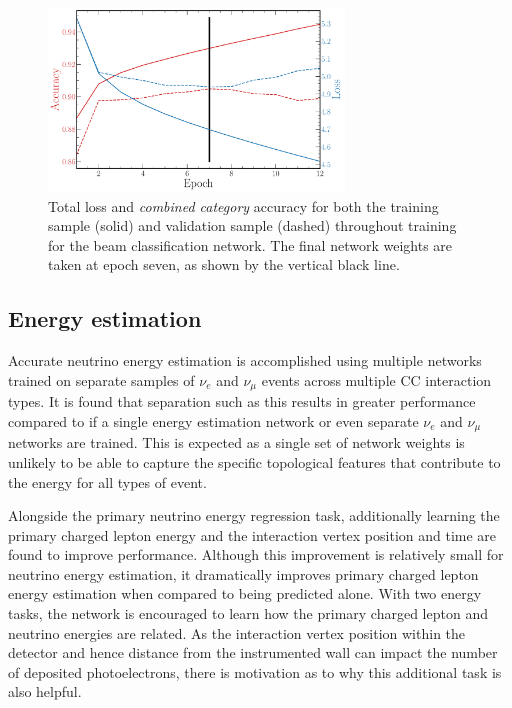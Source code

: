 \begin{figure} %
    \includegraphics[width=0.7\textwidth]{diagrams/7-results/final_beam_history.pdf}
    \caption[Loss and accuracy throughout training for the beam classification network]
    {Total loss and \emph{combined category} accuracy for both the training sample (solid) and
        validation sample (dashed) throughout training for the beam classification network. The
        final network weights are taken at epoch seven, as shown by the vertical black line.}
    \label{fig:final_beam_history}
\end{figure}

\subsection{Energy estimation} %
\label{sec:cnn_specific_energy} %

Accurate neutrino energy estimation is accomplished using multiple networks trained on separate
samples of $\nu_{e}$ and $\nu_{\mu}$ events across multiple CC interaction types. It is found that
separation such as this results in greater performance compared to if a single energy estimation
network or even separate $\nu_{e}$ and $\nu_{\mu}$ networks are trained. This is expected as a
single set of network weights is unlikely to be able to capture the specific topological features
that contribute to the energy for all types of event.

Alongside the primary neutrino energy regression task, additionally learning the primary charged
lepton energy and the interaction vertex position and time are found to improve performance.
Although this improvement is relatively small for neutrino energy estimation, it dramatically
improves primary charged lepton energy estimation when compared to being predicted alone. With two
energy tasks, the network is encouraged to learn how the primary charged lepton and neutrino
energies are related. As the interaction vertex position within the detector and hence distance
from the instrumented wall can impact the number of deposited photoelectrons, there is motivation
as to why this additional task is also helpful.

